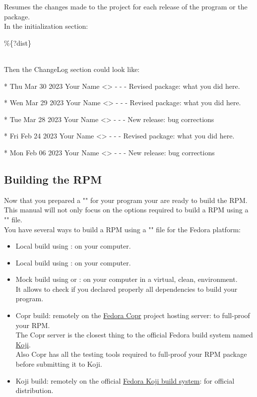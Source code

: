 Resumes the changes made to the project for each release of the program or the package. \\[0.25cm]
In the initialization section:
{\footnotesize{
\begin{script}
   
   \%\{?dist\}
\end{script}
}}
\\
\noindent Then the ChangeLog section could look like:
{\footnotesize{
\begin{script}
* Thu Mar 30 2023 Your Name <\email> - -
- Revised package: what you did here.

* Wen Mar 29 2023 Your Name <\email> - -
- Revised package: what you did here.

* Tue Mar 28 2023 Your Name <\email> - -
- New release: bug corrections

* Fri Feb 24 2023 Your Name <\email> - -
- Revised package: what you did here.

* Mon Feb 06 2023 Your Name <\email> - -
- New release: bug corrections
\end{script}
}}

\newpage
\subsection{Building the RPM}

Now that you prepared a "" for your program your are ready to build the RPM. \\
This manual will not only focus on the options required to build a RPM using a "" file. \\[0.25cm]
You have several ways to build a RPM using a "" file for the Fedora platform:
\begin{itemize}
\item Local build using : on your computer.
\item Local build using : on your computer.
\item Mock build using  or : on your computer in a virtual, clean, environment.\\ 
It allows to check if you declared properly all dependencies to build your program.
\item Copr build: remotely on the \href{https://copr.fedorainfracloud.org}{Fedora Copr} project hosting server: to full-proof your RPM. \\
The Copr server is the closest thing to the official Fedora build system named \href{https://koji.fedoraproject.org/koji}{Koji}. \\
Also Copr has all the testing tools required to full-proof your RPM package before submitting it to Koji. 
\item Koji build: remotely on the official \href{https://koji.fedoraproject.org/koji}{Fedora Koji build system}: for official distribution.
\end{itemize}

